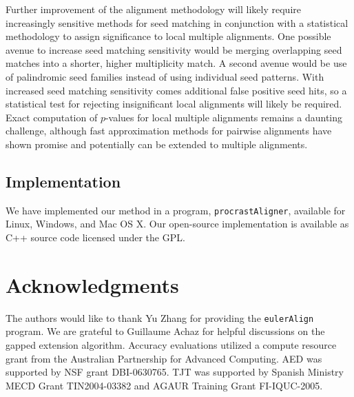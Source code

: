 \documentclass{ws-procs975x65}
\begin{document}
Further improvement of the alignment methodology will likely require
increasingly sensitive methods for seed matching in conjunction with a
statistical methodology to assign significance to local multiple
alignments.  One possible avenue to increase seed matching sensitivity
would be merging overlapping seed matches into a shorter, higher
multiplicity match.  A second avenue would be use of palindromic seed
families instead of using individual seed patterns. With increased
seed matching sensitivity comes additional false positive seed hits,
so a statistical test for rejecting insignificant local alignments
will likely be required.  Exact computation of $p$-values for local
multiple alignments remains a daunting challenge, although fast
approximation methods for pairwise alignments have shown
promise\cite{repseek} and potentially can be extended to multiple
alignments\cite{ref-related1}.

\subsection{Implementation}
We have implemented our method in a program, \texttt{procrastAligner},
available for Linux, Windows, and Mac OS X. Our open-source
implementation is available as C++ source code licensed under the GPL.

\section{ Acknowledgments }
The authors would like to thank Yu Zhang for providing the
\texttt{eulerAlign} program. We are grateful to Guillaume Achaz for
helpful discussions on the gapped extension algorithm. Accuracy
evaluations utilized a compute resource grant from the Australian
Partnership for Advanced Computing.  AED was supported by NSF grant
DBI-0630765. TJT was supported by Spanish Ministry MECD Grant
TIN2004-03382 and AGAUR Training Grant FI-IQUC-2005.




\end{document}
